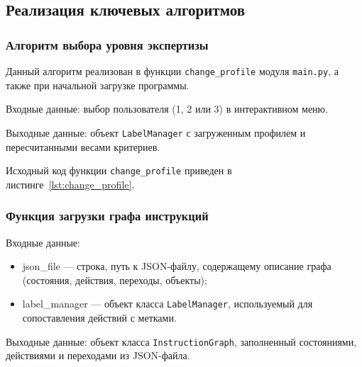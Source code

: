 \subsection{Реализация ключевых алгоритмов}

\subsubsection{Алгоритм выбора уровня экспертизы}

Данный алгоритм реализован в функции \texttt{change\_profile} модуля \texttt{main.py}, а также при начальной загрузке программы. 

Входные данные: выбор пользователя (1, 2 или 3) в интерактивном меню.

Выходные данные: объект \texttt{LabelManager} с загруженным профилем и пересчитанными весами критериев.

Исходный код функции \texttt{change\_profile} приведен в листинге~\ref{lst:change_profile}.


\subsubsection{Функция загрузки графа инструкций}

Входные данные:
\begin{itemize}
    \item json\_file --- строка, путь к JSON-файлу, содержащему описание графа (состояния, действия, переходы, объекты);
    \item label\_manager --- объект класса \texttt{LabelManager}, используемый для сопоставления действий с метками.
\end{itemize}

Выходные данные: объект класса \texttt{InstructionGraph}, заполненный состояниями, действиями и переходами из JSON-файла.

